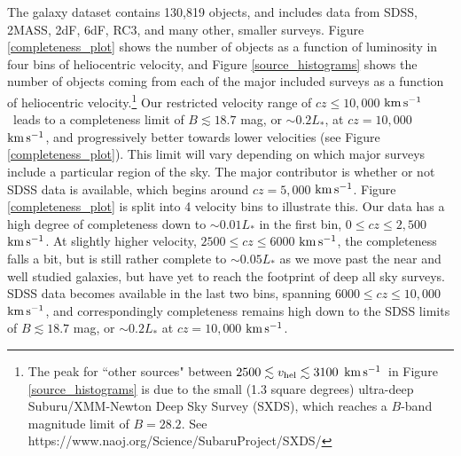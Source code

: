 \documentclass[twocolumn,tighten]{aastex62}
\newcommand{\kms}{$\rm km\, s^{-1}$}
\begin{document}
The galaxy dataset contains 130,819  objects, and includes data from SDSS, 2MASS, 2dF, 6dF, RC3, and many other, smaller surveys. Figure \ref{completeness_plot} shows the number of objects as a function of luminosity in four bins of heliocentric velocity, and Figure \ref{source_histograms} shows the number of objects coming from each of the major included surveys as a function of heliocentric velocity.\footnote{The peak for ``other sources" between $2500 \lesssim v_{\rm hel} \lesssim 3100$ \kms~in Figure \ref{source_histograms} is due to the small (1.3 square degrees) ultra-deep Suburu/XMM-Newton Deep Sky Survey (SXDS), which reaches a $B$-band magnitude limit of $B=28.2$. See https://www.naoj.org/Science/SubaruProject/SXDS/} Our restricted velocity range of $cz \leq 10,000$ \kms~leads to a completeness limit of $B \lesssim 18.7$ mag, or $\sim0.2 L_*$, at $cz = 10,000$ \kms, and progressively better towards lower velocities (see Figure \ref{completeness_plot}). This limit will vary depending on which major surveys include a particular region of the sky. The major contributor is whether or not SDSS data is available, which begins around $cz = 5,000$ \kms. Figure \ref{completeness_plot} is split into 4 velocity bins to illustrate this. Our data has a high degree of completeness down to $\sim0.01 L_*$ in the first bin, $0 \leq cz \leq 2,500$ \kms. At slightly higher velocity, $2500 \leq cz \leq 6000$ \kms, the completeness falls a bit, but is still rather complete to $\sim0.05 L_*$ as we move past the near and well studied galaxies, but have yet to reach the footprint of deep all sky surveys. SDSS data becomes available in the last two bins, spanning $6000 \leq cz \leq 10,000$ \kms, and correspondingly completeness remains high down to the SDSS limits of $B \lesssim 18.7$ mag, or $\sim0.2 L_*$ at $cz = 10,000$ \kms. 
\end{document}
